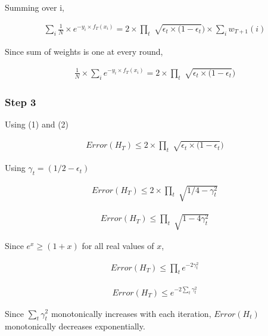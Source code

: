 \documentclass[11pt, a4paper]{article}
\begin{document}
Summing over i,

\begin{align*}
	\sum\limits_i \frac{1}{N} \times e^{-y_i \times f_T(x_i)}  = 2 \times \prod\limits_t{\sqrt[]{\epsilon_t \times (1- \epsilon_t}}) \times \sum\limits_i w_{T+1}(i) 
\end{align*}

Since sum of weights is one at every round,

\begin{align}
	\frac{1}{N} \times \sum\limits_i  e^{-y_i \times f_T(x_i)}  = 2 \times \prod\limits_t{\sqrt[]{\epsilon_t \times (1- \epsilon_t}}) 
\end{align}

\subsubsection{Step 3}

Using (1) and (2)

\begin{align*}
	Error(H_T) \leq 2 \times \prod\limits_t{\sqrt[]{\epsilon_t \times (1- \epsilon_t}}) 
\end{align*}

Using $\gamma_t = (1/2 - \epsilon_t)$

\begin{align*}
	Error(H_T) \leq 2 \times \prod\limits_t{\sqrt[]{1/4 - \gamma_t^2}} 
\end{align*}

\begin{align*}
	Error(H_T) \leq \prod\limits_t{\sqrt[]{1 - 4\gamma_t^2}} 
\end{align*}

Since $e^x \geq (1+x)$ for all real values of $x$,

\begin{align*}
	Error(H_T) \leq \prod\limits_t{e^{-2\gamma_t^2}} 
\end{align*}

\begin{align*}
	Error(H_T) \leq e^{-2\sum\limits_t{\gamma_t^2}} 
\end{align*}

Since $\sum\limits_t{\gamma_t^2}$ monotonically increases with each iteration, $Error(H_t)$ monotonically decreases exponentially.
\end{document}
